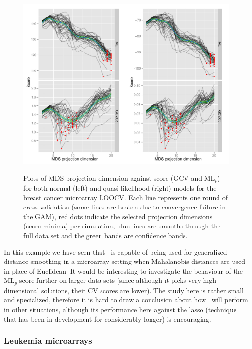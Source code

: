 \begin{figure}
\centering
\includegraphics[width=6in]{gds/figs/breastcancer-dimselect.pdf} \\
\caption{Plots of MDS projection dimension against score (GCV and $\text{ML}_p$) for both normal (left) and quasi-likelihood (right) models for the breast cancer microarray LOOCV. Each line represents one round of cross-validation (some lines are broken due to convergence failure in the GAM), red dots indicate the selected projection dimensions (score minima) per simulation, blue lines are smooths through the full data set and the green bands are confidence bands.}
\label{breastcancer-dimselect}
\end{figure}

In this example we have seen that \mdsds\ is capable of being used for generalized distance smoothing in a microarray setting when Mahalanobis distances are used in place of Euclidean. It would be interesting to investigate the behaviour of the $\text{ML}_p$ score further on larger data sets (since although it picks very high dimensional solutions, their CV scores are lower). The study here is rather small and specialized, therefore it is hard to draw a conclusion about how \mdsds\ will perform in other situations, although its performance here against the lasso (technique that has been in development for considerably longer) is encouraging.

\subsubsection{Leukemia microarrays}

